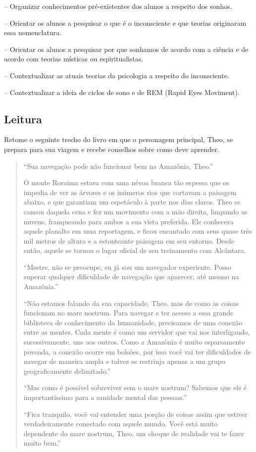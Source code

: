 \documentclass[12pt]{extarticle}
\begin{document}
-- Organizar conhecimentos pré-existentes dos alunos a respeito dos sonhos.

-- Orientar os alunos a pesquisar o que é o inconsciente e que teorias originaram essa nomenclatura.

-- Orientar os alunos a pesquisar por que sonhamos de acordo com a ciência e de acordo com teorias místicas ou espiritualistas.

-- Contextualizar as atuais teorias da psicologia a respeito do inconsciente.

-- Contextualizar a ideia de ciclos de sono e de REM (Rapid Eyes Moviment).

\subsection{Leitura}

\bnccativividadesleitura


Retome o seguinte trecho do livro em que o personagem principal, Theo, se prepara 
para sua viagem e recebe conselhos sobre como deve aprender.  

\begin{quote}
``Sua navegação pode não funcionar bem na Amazônia, Theo.''

O monte Roraima estava com uma névoa branca tão espessa que os impedia
de ver as árvores e os inúmeros rios que cortavam a paisagem abaixo, e
que garantiam um espetáculo à parte nos dias claros. Theo se cansou
daquela cena e fez um movimento com a mão direita, limpando as nuvens,
franqueando para ambos a sua vista preferida. Ele conhecera aquele
planalto em uma reportagem, e ficou encantado com seus quase três mil
metros de altura e a estonteante paisagem em seu entorno. Desde então,
aquele se tornou o lugar oficial de seu treinamento com Alcântara.

``Mestre, não se preocupe, eu já sou um navegador experiente. Posso
superar qualquer dificuldade de navegação que aparecer, até mesmo na
Amazônia.''

``Não estamos falando da sua capacidade, Theo, mas de como as coisas
funcionam no mare nostrum. Para navegar e ter acesso a essa grande
biblioteca de conhecimento da humanidade, precisamos de uma conexão entre
as mentes. Cada mente é como um servidor que vai nos interligando,
sucessivamente, uns aos outros. Como a Amazônia é muito esparsamente
povoada, a conexão ocorre em bolsões, por isso você vai ter dificuldades
de navegar de maneira ampla e talvez se restrinja apenas a um grupo
geograficamente delimitado.''

``Mas como é possível sobreviver sem o mare nostrum? Sabemos que ele é
importantíssimo para a sanidade mental das pessoas.''

``Fica tranquilo, você vai entender uma porção de coisas assim que
estiver verdadeiramente conectado com aquele mundo. Você está muito
dependente do mare nostrum, Theo, um choque de realidade vai te fazer
muito bem.''

\end{quote}
\end{document}
